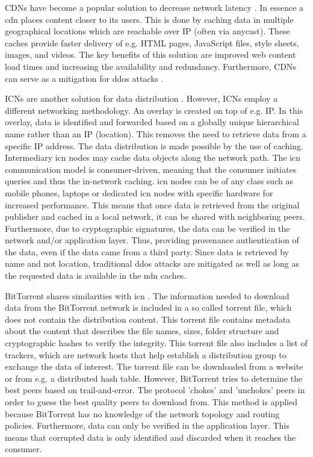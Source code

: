 CDNs have become a popular solution to decrease network latency \cite{lee2012towards}. In essence a \gls{cdn} places content closer to its users. This is done by caching data in multiple geographical locations which are reachable over IP (often via anycast). These caches provide faster delivery of e.g. HTML pages, JavaScript files, style sheets, images, and videos. The key benefits of this solution are improved web content load times and increasing the availability and redundancy. Furthermore, CDNs can serve as a mitigation for \gls{ddos} attacks \cite{cloudflare-cdn}.

ICNs are another solution for data distribution \cite{jacobson2009networking}. However, ICNs employ a different networking methodology. An overlay is created on top of e.g. IP. In this overlay, data is identified and forwarded based on a globally unique hierarchical name rather than an IP (location). This removes the need to retrieve data from a specific IP address. The data distribution is made possible by the use of caching. Intermediary \gls{icn} nodes may cache data objects along the network path. The \gls{icn} communication model is consumer-driven, meaning that the consumer initiates queries and thus the in-network caching. \gls{icn} nodes can be of any class such as mobile phones, laptops or dedicated \gls{icn} nodes with specific hardware for increased performance. This means that once data is retrieved from the original publisher and cached in a local network, it can be shared with neighboring peers. Furthermore, due to cryptographic signatures, the data can be verified in the network and/or application layer. Thus, providing provenance authentication of the data, even if the data came from a third party. Since data is retrieved by name and not location, traditional \gls{ddos} attacks are mitigated as well as long as the requested data is available in the \gls{ndn} caches.

BitTorrent shares similarities with \gls{icn} \cite{mastorakis2017ntorrent}. The information needed to download data from the BitTorrent network is included in a so called torrent file, which does not contain the distribution content. This torrent file contains metadata about the content that describes the file names, sizes, folder structure and cryptographic hashes to verify the integrity. This torrent file also includes a list of trackers, which are network hosts that help establish a distribution group to exchange the data of interest. The torrent file can be downloaded from a website or from e.g. a distributed hash table. However, BitTorrent tries to determine the best peers based on trail-and-error. The protocol 'chokes' and 'unchokes' peers in order to guess the best quality peers to download from. This method is applied because BitTorrent has no knowledge of the network topology and routing policies. Furthermore, data can only be verified in the application layer. This means that corrupted data is only identified and discarded when it reaches the consumer.

